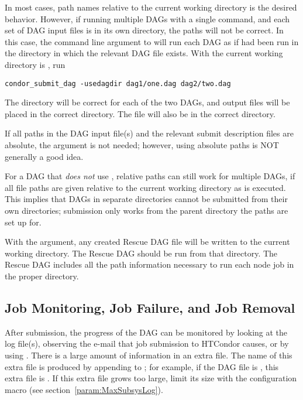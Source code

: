 In most cases, path names relative to the current working directory 
is the desired behavior.
However, if running
multiple DAGs with a single  command, 
and each set of DAG input files is in its own directory, 
the paths will not be correct. 
In this case,
the  command line argument to 
will run each DAG as if  had been run 
in the directory in which the relevant DAG file exists.
With the current working directory
is , run 
\begin{verbatim}
condor_submit_dag -usedagdir dag1/one.dag dag2/two.dag
\end{verbatim}
The directory will be correct for each of the two DAGs,
and output files will be placed in the correct directory.
The  file will also be in the correct directory.

If all paths in the DAG input file(s) and the relevant submit
description files are absolute,
the  argument is not needed;
however, using absolute paths is NOT generally a good idea.

For a DAG that \emph{does not} use , 
relative paths can still work for multiple DAGs, 
if all file paths are given relative to
the current working directory as  is executed.
This implies that DAGs in separate directories
cannot be submitted from their own directories;
submission only works from the parent directory the paths are set up for.

With the  argument, any created 
Rescue DAG file will be written to
the current working directory.
The Rescue DAG should be run from that directory.
The Rescue DAG includes all the path information necessary to
run each node job in the proper directory.

\subsection{\label{sec:DAGMonitoring}Job Monitoring, Job Failure, and Job Removal}

After submission, the progress of the DAG can be monitored
by looking at the log file(s),
observing the e-mail that job submission to HTCondor causes,
or by using  .
There is a large amount of information in an extra file.
The name of this extra file is produced by appending
 to ; for example, if the
DAG file is , this extra file is
.
If this extra file grows too large, limit its size
with the  configuration macro (see
section~\ref{param:MaxSubsysLog}).

